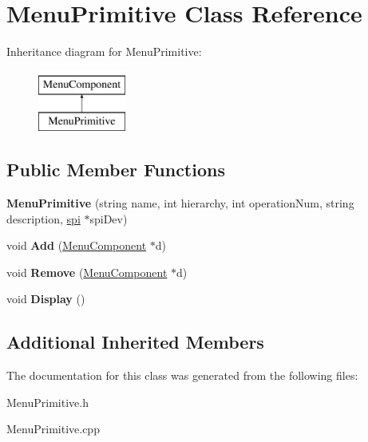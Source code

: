\hypertarget{classMenuPrimitive}{\section{Menu\-Primitive Class Reference}
\label{classMenuPrimitive}
}
Inheritance diagram for Menu\-Primitive\-:\begin{figure}[H]
\begin{center}
\leavevmode
\includegraphics[height=2.000000cm]{dd/db3/classMenuPrimitive}
\end{center}
\end{figure}
\subsection*{Public Member Functions}
\begin{DoxyCompactItemize}
\item 
\hypertarget{classMenuPrimitive_a1676c1cd62bcee6034a7d393e422e4bd}{{\bfseries Menu\-Primitive} (string name, int hierarchy, int operation\-Num, string description, \hyperlink{classspi}{spi} $\ast$spi\-Dev)}\label{classMenuPrimitive_a1676c1cd62bcee6034a7d393e422e4bd}

\item 
\hypertarget{classMenuPrimitive_a452cdf28b74ebc7a2248ea044b457140}{void {\bfseries Add} (\hyperlink{classMenuComponent}{Menu\-Component} $\ast$d)}\label{classMenuPrimitive_a452cdf28b74ebc7a2248ea044b457140}

\item 
\hypertarget{classMenuPrimitive_a4c2032990cfc38456d65c7ad4213406d}{void {\bfseries Remove} (\hyperlink{classMenuComponent}{Menu\-Component} $\ast$d)}\label{classMenuPrimitive_a4c2032990cfc38456d65c7ad4213406d}

\item 
\hypertarget{classMenuPrimitive_acf5b9c7eff88942899b53459a2b45837}{void {\bfseries Display} ()}\label{classMenuPrimitive_acf5b9c7eff88942899b53459a2b45837}

\end{DoxyCompactItemize}
\subsection*{Additional Inherited Members}


The documentation for this class was generated from the following files\-:\begin{DoxyCompactItemize}
\item 
Menu\-Primitive.\-h\item 
Menu\-Primitive.\-cpp\end{DoxyCompactItemize}
